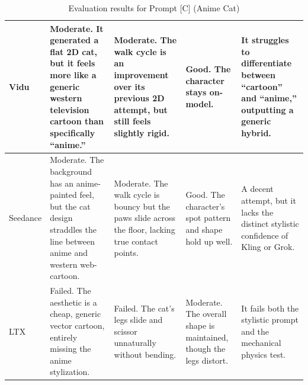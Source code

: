 \documentclass[sigconf]{acmart}
\begin{document}
\begin{table}[H]
\begin{tabularx}{\textwidth}{| l | >{\raggedright\arraybackslash}X | >{\raggedright\arraybackslash}X | >{\raggedright\arraybackslash}X | >{\raggedright\arraybackslash}X |}
        Vidu           & Moderate. It generated a flat 2D cat, but it feels more like a generic western television cartoon than specifically ``anime.''                                                               & Moderate. The walk cycle is an improvement over its previous 2D attempt, but still feels slightly rigid.   & Good. The character stays on-model.                                 & It struggles to differentiate between ``cartoon'' and ``anime,'' outputting a generic hybrid.                                                                         \\ \hline
        Seedance       & Moderate. The background has an anime-painted feel, but the cat design straddles the line between anime and western web-cartoon.                                                             & Moderate. The walk cycle is bouncy but the paws slide across the floor, lacking true contact points.       & Good. The character's spot pattern and shape hold up well.          & A decent attempt, but it lacks the distinct stylistic confidence of Kling or Grok.                                                                                    \\ \hline
        LTX            & Failed. The aesthetic is a cheap, generic vector cartoon, entirely missing the anime stylization.                                                                                            & Failed. The cat's legs slide and scissor unnaturally without bending.                                      & Moderate. The overall shape is maintained, though the legs distort. & It fails both the stylistic prompt and the mechanical physics test.                                                                                                   \\ \hline
    \end{tabularx}
    \caption{Evaluation results for Prompt [C] (Anime Cat)}
    \label{tab:anime}
\end{table}


\end{document}
